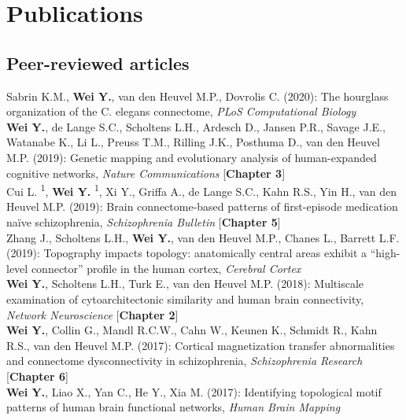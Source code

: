 \pagestyle{backmatter}

\chapter{Publications}
\label{publications}

\section*{Peer-reviewed articles}

Sabrin K.M., \textbf{Wei Y.}, van den Heuvel M.P., Dovrolis C. (2020): The hourglass organization of the C. elegans connectome, \textit{PLoS Computational Biology}\\

\noindent
\textbf{Wei Y.}, de Lange S.C., Scholtens L.H., Ardesch D., Jansen P.R., Savage J.E., Watanabe K., Li L., Preuss T.M., Rilling J.K., Posthuma D., van den Heuvel M.P. (2019): Genetic mapping and evolutionary analysis of human-expanded cognitive networks, \textit{Nature Communications} [\textbf{Chapter 3}]\\

\noindent
Cui L. \textsuperscript{1}, \textbf{Wei Y.} \textsuperscript{1}, Xi Y., Griffa A., de Lange S.C., Kahn R.S., Yin H., van den Heuvel M.P. (2019): Brain connectome-based patterns of first-episode medication naïve schizophrenia, \textit{Schizophrenia Bulletin} [\textbf{Chapter 5}]\\ 

\noindent
Zhang J., Scholtens L.H., \textbf{Wei Y.}, van den Heuvel M.P., Chanes L., Barrett L.F. (2019): Topography impacts topology: anatomically central areas exhibit a “high-level connector” profile in the human cortex, \textit{Cerebral Cortex}\\

\noindent
\textbf{Wei Y.}, Scholtens L.H., Turk E., van den Heuvel M.P. (2018): Multiscale examination of cytoarchitectonic similarity and human brain connectivity, \textit{Network Neuroscience} [\textbf{Chapter 2}]\\ 

\noindent
\textbf{Wei Y.}, Collin G., Mandl R.C.W., Cahn W., Keunen K., Schmidt R., Kahn R.S., van den Heuvel M.P. (2017): Cortical magnetization transfer abnormalities and connectome dysconnectivity in schizophrenia, \textit{Schizophrenia Research} [\textbf{Chapter 6}]\\ 

\newpage
\noindent
\textbf{Wei Y.}, Liao X., Yan C., He Y., Xia M. (2017): Identifying topological motif patterns of human brain functional networks, \textit{Human Brain Mapping}\\ 

